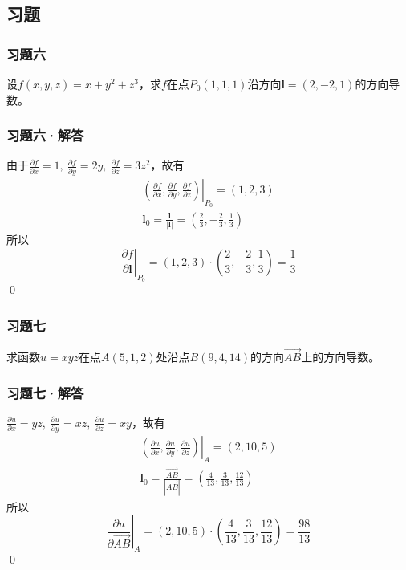 \subsection{习题}
\begin{frame}
    \frametitle{习题六}

    设$f(x,y,z)=x+y^2+z^3$，求$f$在点$P_0(1,1,1)$沿方向$\boldsymbol{l}=(2,-2,1)$的方向导数。

\end{frame}

\begin{frame}
    \frametitle{习题六·解答}

    由于$\displaystyle\frac{\partial f}{\partial x}=1,\ \frac{\partial f}{\partial y}=2y,\ \frac{\partial f}{\partial z}=3z^2$，故有\pause
    \begin{gather*}
        \left.\left(\frac{\partial f}{\partial x},\frac{\partial f}{\partial y},\frac{\partial f}{\partial z}\right)\right|_{P_0}=(1,2,3)\\
        \boldsymbol{l}_0=\frac{\boldsymbol{l}}{|\boldsymbol{l}|}=\left(\frac{2}{3},-\frac{2}{3},\frac{1}{3}\right)
    \end{gather*}\pause
    所以
    $$\left.\frac{\partial f}{\partial \boldsymbol{l}}\right|_{P_0}=(1,2,3)\cdot \left(\frac{2}{3},-\frac{2}{3},\frac{1}{3}\right)=\frac{1}{3}$$
    \qed

\end{frame}

\begin{frame}
    \frametitle{习题七}

    求函数$u=xyz$在点$A(5,1,2)$处沿点$B(9,4,14)$的方向$\overrightarrow{AB}$上的方向导数。

\end{frame}

\begin{frame}
    \frametitle{习题七·解答}

    $\displaystyle\frac{\partial u}{\partial x}=yz,\ \frac{\partial u}{\partial y}=xz,\ \frac{\partial u}{\partial z}=xy$，故有\pause
    \begin{gather*}
        \left.\left(\frac{\partial u}{\partial x},\frac{\partial u}{\partial y},\frac{\partial u}{\partial z}\right)\right|_{A}=(2,10,5)\\
        \boldsymbol{l}_0=\frac{\overrightarrow{AB}}{|\overrightarrow{AB}|}=\left(\frac{4}{13},\frac{3}{13},\frac{12}{13}\right)
    \end{gather*}\pause
    所以
    $$\left.\frac{\partial u}{\partial \overrightarrow{AB}}\right|_{A}=(2,10,5)\cdot \left(\frac{4}{13},\frac{3}{13},\frac{12}{13}\right)=\frac{98}{13}$$
    \qed

\end{frame}
